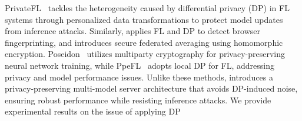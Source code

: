 PrivateFL~\cite{yang2023privatefl} tackles the heterogeneity caused by differential privacy (DP) in FL systems through personalized data transformations to protect model updates from inference attacks. Similarly, \cite{annamalai2023fp} applies FL and DP to detect browser fingerprinting, and \cite{dasu2022prov} introduces secure federated averaging using homomorphic encryption. Poseidon~\cite{sav2020poseidon} utilizes multiparty cryptography for privacy-preserving neural network training, while PpeFL~\cite{wang2023ppefl} adopts local DP for FL, addressing privacy and model performance issues. Unlike these methods, \Sys introduces a privacy-preserving multi-model server architecture that avoids DP-induced noise, ensuring robust performance while resisting inference attacks. We provide experimental results on the issue of applying DP 











